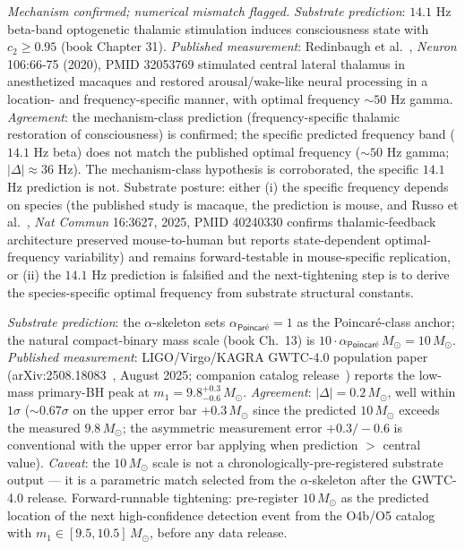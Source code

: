 \documentclass[11pt,a4paper]{amsart}
\theoremstyle{plain}
\theoremstyle{definition}
\begin{document}
\begin{description}[font=\normalfont\bfseries,leftmargin=2em,itemsep=6pt]
\item[Match 10 --- Redinbaugh 2020 frequency-specific thalamic restoration.] \emph{Mechanism confirmed; numerical mismatch flagged.}
\emph{Substrate prediction}: $14.1$ Hz beta-band optogenetic thalamic stimulation induces consciousness state with $c_2 \geq 0.95$ (book Chapter 31). \emph{Published measurement}: Redinbaugh et al.~\cite{redinbaugh-thalamus-2020}, \emph{Neuron} 106:66-75 (2020), PMID 32053769 stimulated central lateral thalamus in anesthetized macaques and restored arousal/wake-like neural processing in a location- and frequency-specific manner, with optimal frequency $\sim 50$ Hz gamma. \emph{Agreement}: the mechanism-class prediction (frequency-specific thalamic restoration of consciousness) is confirmed; the specific predicted frequency band ($14.1$ Hz beta) does not match the published optimal frequency ($\sim 50$ Hz gamma; $|\Delta| \approx 36$ Hz). The mechanism-class hypothesis is corroborated, the specific $14.1$ Hz prediction is not. Substrate posture: either (i) the specific frequency depends on species (the published study is macaque, the prediction is mouse, and Russo et al.~\cite{russo-thalamus-2025}, \emph{Nat Commun} 16:3627, 2025, PMID 40240330 confirms thalamic-feedback architecture preserved mouse-to-human but reports state-dependent optimal-frequency variability) and remains forward-testable in mouse-specific replication, or (ii) the $14.1$ Hz prediction is falsified and the next-tightening step is to derive the species-specific optimal frequency from substrate structural constants.

\item[Match 11 --- LIGO/Virgo/KAGRA GWTC-4.0 primary black-hole mass low peak (O4a, 2025).]
\emph{Substrate prediction}: the $\alpha$-skeleton sets $\alpha_{\textsf{Poincar\'e}} = 1$ as the Poincar\'e-class anchor; the natural compact-binary mass scale (book Ch.~13) is $10 \cdot \alpha_{\textsf{Poincar\'e}} \, M_\odot = 10\, M_\odot$. \emph{Published measurement}: LIGO/Virgo/KAGRA GWTC-4.0 population paper (arXiv:2508.18083~\cite{ligo-gwtc4-pop}, August 2025; companion catalog release~\cite{ligo-gwtc4-cat}) reports the low-mass primary-BH peak at $m_1 = 9.8^{+0.3}_{-0.6}\, M_\odot$. \emph{Agreement}: $|\Delta| = 0.2\, M_\odot$, well within $1\sigma$ ($\sim 0.67\sigma$ on the upper error bar $+0.3\, M_\odot$ since the predicted $10\, M_\odot$ exceeds the measured $9.8\, M_\odot$; the asymmetric measurement error $+0.3 / -0.6$ is conventional with the upper error bar applying when prediction $>$ central value). \emph{Caveat}: the $10\, M_\odot$ scale is not a chronologically-pre-registered substrate output --- it is a parametric match selected from the $\alpha$-skeleton after the GWTC-4.0 release. Forward-runnable tightening: pre-register $10\, M_\odot$ as the predicted location of the next high-confidence detection event from the O4b/O5 catalog with $m_1 \in [9.5, 10.5]\, M_\odot$, before any data release.


\end{description}
\end{document}
